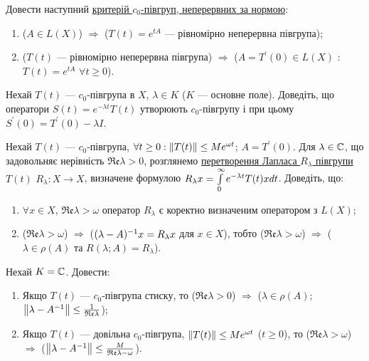 
\begin{exercise}
    Довести наступний \ul{критерій $c_0$-півгруп, неперервних за 
    нормою}:
    \begin{enumerate}
        \item ($A \in L(X)$) $\Rightarrow$ ($T(t) = e^{tA}$ 
        --- рівномірно неперервна півгрупа);
        \item ($T(t)$ --- рівномірно неперервна півгрупа) $\Rightarrow$ 
        ($A = T^{\prime}(0) \in L(X)$ : $T(t) = e^{tA}$ $\forall t \geq 0$).
    \end{enumerate}
\end{exercise}

\begin{exercise}
    Нехай $T(t)$ --- $c_0$-півгрупа в $X$, $\lambda \in K$ ($K$ --- основне поле). Доведіть, 
    що оператори $S(t) = e^{-\lambda t}T(t)$ утворюють $c_0$-півгрупу і при цьому 
    $S^{\prime}(0) = T^{\prime}(0) - \lambda I$. 
\end{exercise}

\begin{exercise}
    Нехай $T(t)$ --- $c_0$-півгрупа, $\forall t \geq 0 : \left\lVert T(t)\right\rVert \leq Me^{\omega t}$;
    $A = T^{\prime}(0)$. Для $\lambda \in \mathbb{C}$, що задовольняє нерівність $\mathfrak{Re}\lambda > 0$,
    розглянемо \ul{перетворення Лапласа $R_\lambda$ півгрупи $T(t)$} $R_\lambda : 
    X \rightarrow X$, визначене формулою $R_\lambda x = \int\limits_{0}^{\infty}e^{-\lambda t} T(t)
    x dt$. Доведіть, що:
    \begin{enumerate}
        \item $\forall x \in X$, $\mathfrak{Re} \lambda > \omega$ оператор 
        $R_\lambda$ є коректно визначеним оператором з $L(X)$;
        \item ($\mathfrak{Re} \lambda > \omega$) $\Rightarrow$ ($(\lambda - A)^{-1}x = R_\lambda x$ 
        для $x \in X$), тобто ($\mathfrak{Re} \lambda > \omega$) $\Rightarrow$ ($\lambda \in \rho(A)$
        та $R(\lambda; A) = R_\lambda$).
    \end{enumerate}
\end{exercise}

\begin{exercise}
    Нехай $K = \mathbb{C}$. Довести:
    \begin{enumerate}
        \item Якщо $T(t)$ --- $c_0$-півгрупа стиску, то ($\mathfrak{Re}\lambda > 0$) $\Rightarrow$
        ($\lambda \in \rho(A)$; $\left\lVert\lambda - A^{-1}\right\rVert \leq \frac{1}{\mathfrak{Re} \lambda}$);
        \item Якщо $T(t)$ --- довільна $c_0$-півгрупа, $\left\lVert T(t)\right\rVert \leq Me^{\omega t}$ 
        ($t \geq 0$), то ($\mathfrak{Re} \lambda > \omega$) $\Rightarrow$ 
        ($\left\lVert\lambda - A^{-1}\right\rVert \leq \frac{M}{\mathfrak{Re}\lambda - \omega}$).
    \end{enumerate}
\end{exercise}

